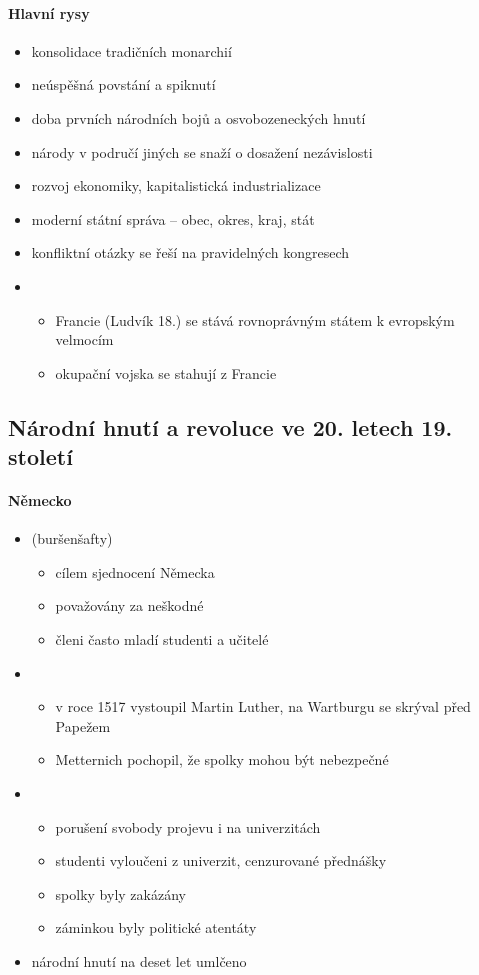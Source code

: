 \paragraph{Hlavní rysy}
\begin{itemize}
\item konsolidace tradičních monarchií
\item neúspěšná povstání a spiknutí
\item doba prvních národních bojů a osvobozeneckých hnutí
\item národy v područí jiných se snaží o dosažení nezávislosti
\item rozvoj ekonomiky, kapitalistická industrializace
\item moderní státní správa -- obec, okres, kraj, stát
\item konfliktní otázky se řeší na pravidelných kongresech
\item {}
	\begin{itemize}
	\item Francie (Ludvík 18.) se stává rovnoprávným státem k evropským velmocím
	\item okupační vojska se stahují z Francie
	\end{itemize}
\end{itemize}

\subsection{Národní hnutí a revoluce ve 20. letech 19. století}
\paragraph{Německo}
\begin{itemize}
\item {} (buršenšafty)
	\begin{itemize}
	\item cílem sjednocení Německa
	\item považovány za neškodné
	\item členi často mladí studenti a učitelé
	\end{itemize}
\item {}
	\begin{itemize}
	\item v roce 1517 vystoupil Martin Luther, na Wartburgu se skrýval před Papežem
	\item Metternich pochopil, že spolky mohou být nebezpečné
	\end{itemize}
\item {}
	\begin{itemize}
	\item porušení svobody projevu i na univerzitách
	\item studenti vyloučeni z univerzit, cenzurované přednášky
	\item spolky byly zakázány 
	\item záminkou byly politické atentáty
	\end{itemize}
\item[\ra] národní hnutí na deset let umlčeno
\end{itemize}

